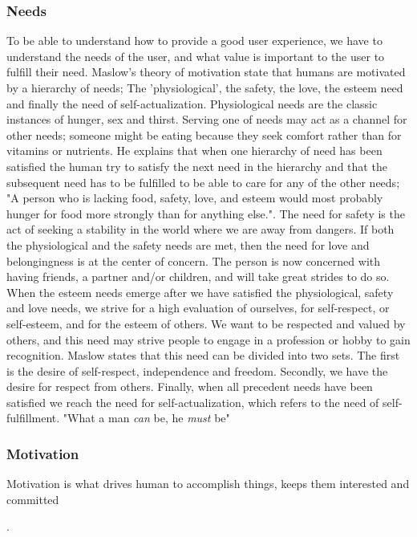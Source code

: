 \subsubsection{Needs}
\label{subsubsec:needs}
To be able to understand how to provide a good user experience, we have to understand the needs of the user, and what value is important to the user to fulfill their need. Maslow’s theory of motivation \cite{Maslow1943} state that humans are motivated by a hierarchy of needs; The 'physiological', the safety, the love, the esteem need and finally the need of self-actualization. Physiological needs are the classic instances of hunger, sex and thirst. Serving one of needs may act as a channel for other needs; someone might be eating because they seek comfort rather than for vitamins or nutrients. He explains that when one hierarchy of need has been satisfied the human try to satisfy the next need in the hierarchy and that the subsequent need has to be fulfilled to be able to care for any of the other needs; "A person who is lacking food, safety, love, and esteem would most probably hunger for food more strongly than for anything else.". The need for safety is the act of seeking a stability in the world where we are away from dangers. If both the physiological and the safety needs are met, then the need for love and belongingness is at the center of concern. The person is now concerned with having friends, a partner and/or children, and will take great strides to do so. When the esteem needs emerge after we have satisfied the physiological, safety and love needs, we strive for a high evaluation of ourselves, for self-respect, or self-esteem, and for the esteem of others. We want to be respected and valued by others, and this need may strive people to engage in a profession or hobby to gain recognition. Maslow states that this need can be divided into two sets. The first is the desire of self-respect, independence and freedom. Secondly, we have the desire for respect from others. Finally, when all precedent needs have been satisfied we reach the need for self-actualization, which refers to the need of self-fulfillment. "What a man \textit{can} be, he \textit{must} be"


\subsubsection{Motivation}
\label{subsec:motivation}
Motivation is what drives human to accomplish things, keeps them interested and committed .

